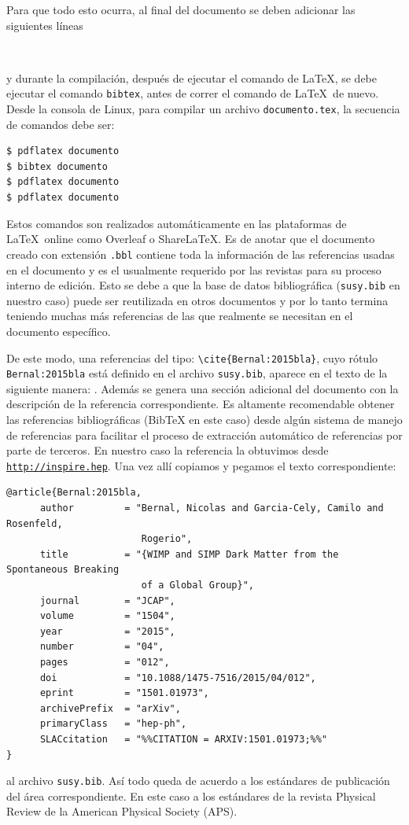 \documentclass{article}
\begin{document}
Para que todo esto ocurra, al final del documento se deben adicionar las siguientes líneas 
\begin{lstlisting}


\end{lstlisting}
y durante la compilación, después de ejecutar el comando de \LaTeX, se debe ejecutar el comando \verb|bibtex|, antes de correr el comando de \LaTeX\ de nuevo. Desde la consola de Linux, para compilar un archivo \verb|documento.tex|, la secuencia de comandos debe ser:
\begin{lstlisting}
$ pdflatex documento 
$ bibtex documento
$ pdflatex documento 
$ pdflatex documento 
\end{lstlisting}
Estos comandos son realizados automáticamente en las plataformas de \LaTeX\ online como Overleaf o ShareLaTeX. 
Es de anotar que el documento creado con extensión \verb|.bbl| contiene toda la información de las referencias usadas en el documento y es el usualmente requerido por las revistas para su proceso interno de edición. Esto se debe a que la base de datos  bibliográfica (\verb|susy.bib| en nuestro caso)  puede ser reutilizada en otros documentos y por lo tanto termina teniendo muchas más referencias de las que realmente se necesitan en el documento específico.

De este modo, una referencias del tipo: \verb|\cite{Bernal:2015bla}|, cuyo rótulo \verb|Bernal:2015bla| está definido en el archivo \verb|susy.bib|, aparece en el texto de la siguiente manera: \cite{Bernal:2015bla}. Además se genera una sección adicional del documento con la descripción de la referencia correspondiente. Es altamente recomendable obtener las referencias bibliográficas (BibTeX en este caso) desde algún sistema de manejo de referencias para facilitar el proceso de extracción automático de referencias por parte de terceros. En nuestro caso la referencia la obtuvimos desde \href{http://inspirehep.net/record/1338091/export/hx}{\texttt{http://inspire.hep}}. Una vez allí copiamos y pegamos el texto correspondiente:
\begin{footnotesize}
\begin{lstlisting}
@article{Bernal:2015bla,
      author         = "Bernal, Nicolas and Garcia-Cely, Camilo and Rosenfeld,
                        Rogerio",
      title          = "{WIMP and SIMP Dark Matter from the Spontaneous Breaking
                        of a Global Group}",
      journal        = "JCAP",
      volume         = "1504",
      year           = "2015",
      number         = "04",
      pages          = "012",
      doi            = "10.1088/1475-7516/2015/04/012",
      eprint         = "1501.01973",
      archivePrefix  = "arXiv",
      primaryClass   = "hep-ph",
      SLACcitation   = "%%CITATION = ARXIV:1501.01973;%%"
}
\end{lstlisting}
\end{footnotesize}
al archivo  \verb|susy.bib|. Así todo queda de acuerdo a los estándares de publicación del área correspondiente. En este caso a los estándares de la revista  Physical Review de la American Physical Society  (APS).



\end{document}

